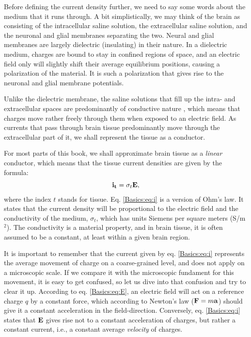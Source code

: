 Before defining the current density further, we need to say some words about the medium that it runs through. A bit simplistically, we may think of the brain as consisting of the intracellular saline solution, the extracellular saline solution, and the neuronal and glial membranes separating the two. Neural and glial membranes are largely dielectric (insulating)  in their nature. In a dielectric medium, charges are bound to stay in confined regions of space, and an electric field only will slightly shift their average equilibrium positions, causing a polarization of the material. It is such a polarization that gives rise to the neuronal and glial membrane potentials. 

Unlike the dielectric membrane, the saline solutions that fill up the intra- and extracellular spaces are predominantly of conductive nature , which means that charges move rather freely through them when exposed to an electric field. As currents that pass through brain tissue predominantly move through the extracellular part of it, we shall represent the tissue as a conductor. 

For most parts of this book, we shall approximate brain tissue as a \textit{linear} conductor, which means that the tissue current densities are given by the formula:
\begin{equation}
{\bf i_t} = \sigma_t {\bf E},
\label{Basics:eq:i}
\end{equation}
where the index $t$ stands for tissue. Eq. \ref{Basics:eq:i} is a version of Ohm's law. It states that the current density will be proportional to the electric field and the conductivity of the medium, $\sigma_t$, which has units Siemens per square meters (S/m$^2$). The conductivity is a material property, and in brain tissue, it is often assumed to be a constant, at least within a given brain region. 

It is important to remember that the current given by eq. \ref{Basics:eq:i} represents the average movement of charge on a coarse-grained level, and does not apply on a microscopic scale. If we compare it with the microscopic fundament for this movement, it is easy to get confused, so let us dive into that confusion and try to clear it up. According to eq. \ref{Basics:eq:E}, an electric field will act on a reference charge $q$ by a constant force, which according to Newton's law (${\bf F} = m{\bf a}$) should give it a constant acceleration in the field-direction. Conversely, eq. \ref{Basics:eq:i} states that ${\bf E}$ gives rise not to a constant acceleration of charges, but rather a constant current, i.e., a constant average \textit{velocity} of charges. 

